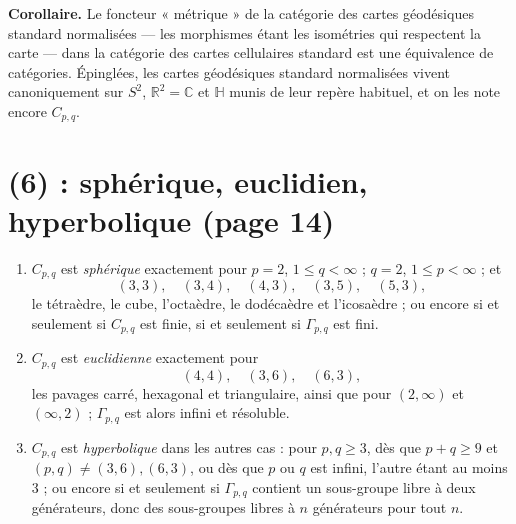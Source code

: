 \documentclass[11pt,a4paper]{article}
\begin{document}
\textbf{Corollaire.} Le foncteur « métrique » de la catégorie des cartes
géodésiques standard normalisées --- les morphismes étant les isométries qui
respectent la carte --- dans la catégorie des cartes cellulaires standard est
une équivalence de catégories. Épinglées, les cartes géodésiques standard
normalisées vivent canoniquement sur $S^{2}$, $\mathbb{R}^{2} = \mathbb{C}$ et
$\mathbb{H}$ munis de leur repère habituel, et on les note encore
$C_{p,q}$.

\section*{(6) : sphérique, euclidien, hyperbolique (page 14)}

\begin{enumerate}
\item[(6)] $C_{p,q}$ est \emph{sphérique} exactement pour $p = 2$,
$1 \leq q < \infty$ ; $q = 2$, $1 \leq p < \infty$ ; et
\[
  (3,3), \quad (3,4), \quad (4,3), \quad (3,5), \quad (5,3),
\]
le tétraèdre, le cube, l'octaèdre, le dodécaèdre et l'icosaèdre ; ou encore si
et seulement si $C_{p,q}$ est finie, si et seulement si $\Gamma_{p,q}$ est fini.
\item[(b)] $C_{p,q}$ est \emph{euclidienne} exactement pour
\[
  (4,4), \quad (3,6), \quad (6,3),
\]
les pavages carré, hexagonal et triangulaire, ainsi que pour $(2, \infty)$ et
$(\infty, 2)$ ; $\Gamma_{p,q}$ est alors infini et résoluble.
\item[(c)] $C_{p,q}$ est \emph{hyperbolique} dans les autres cas : pour
$p, q \geq 3$, dès que $p + q \geq 9$ et $(p,q) \neq (3,6), (6,3)$, ou dès que
$p$ ou $q$ est infini, l'autre étant au moins $3$ ; ou encore si et seulement si $\Gamma_{p,q}$ contient un
sous-groupe libre à deux générateurs, donc des sous-groupes libres à $n$
générateurs pour tout $n$.
\end{enumerate}
\end{document}
